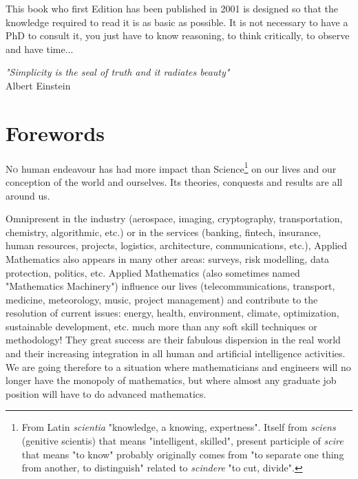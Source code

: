	\newpage
	\thispagestyle{empty}
	\mbox{}
	This book who first Edition has been published in 2001 is designed so that the knowledge required to read it is as basic as possible. It is not necessary to have a PhD to consult it, you just have to know reasoning, to think critically, to observe and have time...
	\begin{flushright}
	\textit{"Simplicity is the seal of truth and it radiates beauty"} \\
	 Albert Einstein
	\end{flushright}
	
	\section{Forewords}
	\lettrine[lines=4]{\color{BrickRed}N}o human endeavour has had more impact than Science\footnote{From Latin \textit{scientia} "knowledge, a knowing, expertness". Itself from \textit{sciens} (genitive scientis) that means "intelligent, skilled", present participle of \textit{scire} that means "to know" probably originally comes from "to separate one thing from another, to distinguish" related to \textit{scindere} "to cut, divide".} on our lives and our conception of the world and ourselves. Its theories, conquests and results are all around us.

	Omnipresent in the industry (aerospace, imaging, cryptography, transportation, chemistry, algorithmic, etc.) or in the services (banking, fintech, insurance, human resources, projects, logistics, architecture, communications, etc.), Applied Mathematics also appears in many other areas: surveys, risk modelling, data protection, politics, etc.  Applied Mathematics (also sometimes named "Mathematics Machinery") influence our lives (telecommunications, transport, medicine, meteorology, music, project management) and contribute to the resolution of current issues: energy, health, environment, climate, optimization, sustainable development, etc. much more than any soft skill techniques or methodology! They great success are their fabulous dispersion in the real world and their increasing integration in all human and artificial intelligence activities. We are going therefore to a situation where mathematicians and engineers will no longer have the monopoly of mathematics, but where almost any graduate job position will have to do advanced mathematics.

